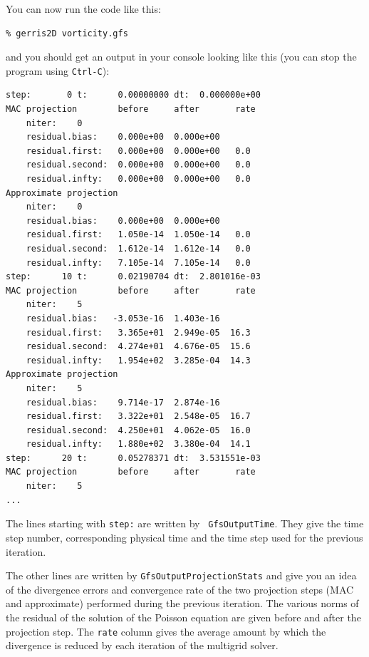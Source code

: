 \documentclass[a4paper]{article}
\begin{document}
You can now run the code like this:
\begin{verbatim}
% gerris2D vorticity.gfs
\end{verbatim}
and you should get an output in your console looking like this (you
can stop the program using {\tt Ctrl-C}):
\begin{verbatim}
step:       0 t:      0.00000000 dt:  0.000000e+00
MAC projection        before     after       rate
    niter:    0
    residual.bias:    0.000e+00  0.000e+00
    residual.first:   0.000e+00  0.000e+00   0.0
    residual.second:  0.000e+00  0.000e+00   0.0
    residual.infty:   0.000e+00  0.000e+00   0.0
Approximate projection
    niter:    0
    residual.bias:    0.000e+00  0.000e+00
    residual.first:   1.050e-14  1.050e-14   0.0
    residual.second:  1.612e-14  1.612e-14   0.0
    residual.infty:   7.105e-14  7.105e-14   0.0
step:      10 t:      0.02190704 dt:  2.801016e-03
MAC projection        before     after       rate
    niter:    5
    residual.bias:   -3.053e-16  1.403e-16
    residual.first:   3.365e+01  2.949e-05  16.3
    residual.second:  4.274e+01  4.676e-05  15.6
    residual.infty:   1.954e+02  3.285e-04  14.3
Approximate projection
    niter:    5
    residual.bias:    9.714e-17  2.874e-16
    residual.first:   3.322e+01  2.548e-05  16.7
    residual.second:  4.250e+01  4.062e-05  16.0
    residual.infty:   1.880e+02  3.380e-04  14.1
step:      20 t:      0.05278371 dt:  3.531551e-03
MAC projection        before     after       rate
    niter:    5
...
\end{verbatim}
The lines starting with {\tt step:} are written by {\tt
GfsOutputTime}. They give the time step number, corresponding physical
time and the time step used for the previous iteration.

The other lines are written by {\tt GfsOutputProjectionStats} and give
you an idea of the divergence errors and convergence rate of the two
projection steps (MAC and approximate) performed during the previous
iteration. The various norms of the residual of the solution of the
Poisson equation are given before and after the projection step. The
{\tt rate} column gives the average amount by which the divergence is
reduced by each iteration of the multigrid solver.
\end{document}
